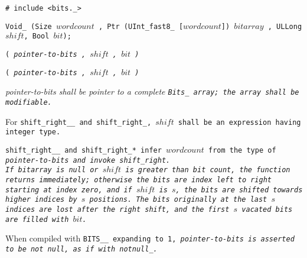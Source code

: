 
\tt{# include <bits._>}

\tt{Void_}  \tt{(Size} $wordcount$%
\tt{, Ptr (UInt_fast8_ [}$wordcount$\tt{])} $bitarray$%
\tt{, ULLong} $shift$\tt{, Bool} $bit$\tt{);}

\s\tt{(}
\it{pointer-to-bits} \tt{,} $shift$ \tt{,} $bit$ \tt{)}

\s\s\tt{(}
\it{pointer-to-bits} \tt{,} $shift$ \tt{,} $bit$ \tt{)}

\enlargethispage*{\baselineskip}
\pagebreak


\it{pointer-to-bits} shall be pointer to a complete
\tt{Bits_} array; the array shall be modifiable.

For \tt{shift_right__} and \tt{shift_right_},
$shift$ shall be an expression having integer type.


\tt{shift_right__} and \tt{shift_right_}* infer $wordcount$ from
the type of \it{pointer-to-bits} and invoke \tt{shift_right}.\\
If \it{bitarray} is null or $shift$ is greater than bit count,
the function returns immediately; otherwise the bits are index
left to right starting at index zero, and if $shift$ is $s$,
the bits are shifted towards higher indices by $s$ positions.
The bits originally at the last $s$ indices are lost after
the right shift, and the first $s$ vacated bits are filled with $bit$.

When compiled with \tt{BITS__} expanding to \tt{1},
\it{pointer-to-bits} is asserted to be not null, as if with \tt{notnull_}.
